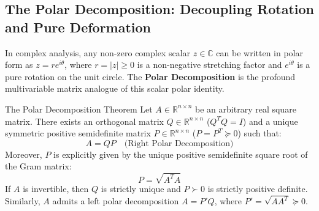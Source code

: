 \subsection{The Polar Decomposition: Decoupling Rotation and Pure Deformation}
In complex analysis, any non-zero complex scalar $z \in \mathbb{C}$ can be written in polar form as $z = r e^{i\theta}$, where $r = |z| \ge 0$ is a non-negative stretching factor and $e^{i\theta}$ is a pure rotation on the unit circle.
The \textbf{Polar Decomposition} is the profound multivariable matrix analogue of this scalar polar identity.

\begin{theorembox}{The Polar Decomposition Theorem}
Let $A \in \mathbb{R}^{n \times n}$ be an arbitrary real square matrix. There exists an orthogonal matrix $Q \in \mathbb{R}^{n \times n}$ ($Q^T Q = I$) and a unique symmetric positive semidefinite matrix $P \in \mathbb{R}^{n \times n}$ ($P = P^T \succeq 0$) such that:
\begin{equation}
A = Q P \quad \text{(Right Polar Decomposition)}
\label{eq:right_polar}
\end{equation}
Moreover, $P$ is explicitly given by the unique positive semidefinite square root of the Gram matrix:
\begin{equation}
P = \sqrt{A^T A}
\end{equation}
If $A$ is invertible, then $Q$ is strictly unique and $P \succ 0$ is strictly positive definite.
Similarly, $A$ admits a left polar decomposition $A = P' Q$, where $P' = \sqrt{A A^T} \succeq 0$.
\end{theorembox}

